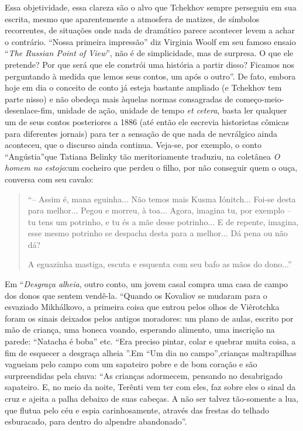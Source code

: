 Essa objetividade, essa clareza são o alvo que Tchekhov sempre perseguiu
em sua escrita, mesmo que aparentemente a atmosfera de matizes, de
símbolos recorrentes, de situações onde nada de dramático parece
acontecer levem a achar o contrário. ``Nossa primeira impressão'' diz
Virginia Woolf em seu famoso ensaio ``\emph{The Russian Point of
View}'', não é de simplicidade, mas de surpresa. O que ele pretende? Por
que será que ele constrói uma história a partir disso? Ficamos nos
perguntando à medida que lemos seus contos, um após o outro''. De fato,
embora hoje em dia o conceito de conto já esteja bastante ampliado (e
Tchekhov tem parte nisso) e não obedeça mais àquelas normas consagradas
de começo-meio-desenlace-fim, unidade de ação, unidade de tempo \emph{et
cetera}, basta ler qualquer um de seus contos posteriores a 1886 (até
então ele escrevia historietas cômicas para diferentes jornais) para ter
a sensação de que nada de nevrálgico ainda aconteceu, que o discurso
ainda continua. Veja-se, por exemplo, o conto ``Angústia''que Tatiana
Belinky tão meritoriamente traduziu, na coletânea \emph{O homem no
estojo}:um cocheiro que perdeu o filho, por não conseguir quem o ouça,
conversa com seu cavalo:

\begin{quote}
``-- Assim é, mana eguinha... Não temos mais Kusma Iónitch... Foi-se
desta para melhor... Pegou e morreu, à toa... Agora, imagina tu, por
exemplo -- tu tens um potrinho, e tu és a mãe desse potrinho... E de
repente, imagina, esse mesmo potrinho se despacha desta para a melhor...
Dá pena ou não dá?

A eguazinha mastiga, escuta e esquenta com seu bafo as mãos do dono...''
\end{quote}

Em ``\emph{Desgraça alheia}, outro conto, um jovem casal compra uma casa
de campo dos donos que sentem vendê-la. ``Quando os Kovaliov se mudaram
para o esvaziado Mikhálkovo, a primeira coisa que entrou pelos olhos de
Viêrotchka foram os sinais deixados pelos antigos moradores: um plano de
aulas, escrito por mão de criança, uma boneca voando, esperando
alimento, uma inscrição na parede: ``Natacha é boba'' etc. ``Era preciso
pintar, colar e quebrar muita coisa, a fim de esquecer a desgraça alheia
''.Em ``Um dia no campo'',crianças maltrapilhas vagueiam pelo campo com
um sapateiro pobre e de bom coração e são surpreendidas pela chuva: ``As
crianças adormecem, pensando no desabrigado sapateiro. E, no meio da
noite, Terênti vem ter com eles, faz sobre eles o sinal da cruz e ajeita
a palha debaixo de suas cabeças. A não ser talvez tão-somente a lua, que
flutua pelo céu e espia carinhosamente, através das frestas do telhado
esburacado, para dentro do alpendre abandonado''.

